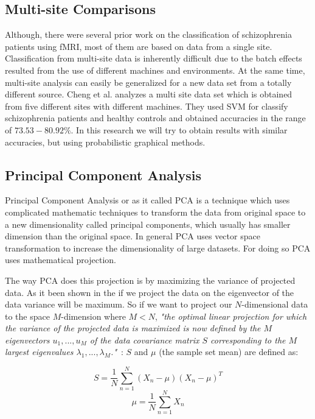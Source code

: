 \documentclass{article} %
\begin{document}
\subsection{Multi-site Comparisons}
Although, there were several prior work on the classification of schizophrenia 
patients using fMRI, most of them are based on data from a single site. 
Classification from multi-site data is inherently difficult due to the batch 
effects resulted from the use of different machines and environments. At the 
same time, multi-site analysis can easily be generalized for a new data set 
from a totally different source. Cheng et al. \cite{Cheng2015} analyzes a 
multi site data set which is obtained from five different sites with different 
machines. They used SVM for classify schizophrenia patients and healthy 
controls and obtained accuracies in the range of $73.53- 80.92\%$. In this 
research we will try to obtain results with similar accuracies, but using 
probabilistic graphical methods.


\subsection{Principal Component Analysis}
Principal Component Analysis or as it called PCA is a technique which uses 
complicated mathematic techniques to transform the data from original space 
to a new dimensionality called principal components, which usually has 
smaller dimension than the original space. In general PCA uses vector 
space transformation to increase the dimensionality of large datasets. For 
doing so PCA uses mathematical projection. \cite{richardson2009principal}

The way PCA does this projection is by maximizing the variance of projected 
data. As it been shown in the \cite{bishop2006pattern} if we project the 
data on the eigenvector of the data variance will be maximum. So if we want 
to project our $N$-dimensional data to the space $M$-dimension where $M<N$, 
\textit{"the optimal linear projection for which the variance of the 
projected data is maximized is now defined by the $M$ eigenvectors 
$u_{1}, ... , u_{M}$ of the data covariance matrix $S$ corresponding to the
$M$ largest eigenvalues $\lambda_{1}, ... ,\lambda_{M}$."}~\cite{bishop2006pattern}: 
$S$ and $\mu$ (the sample set mean) are defined as:

\begin{multicols}{2}
\begin{equation}
S = \frac{1}{N} \sum_{n=1}^{N}(X_{n}-\mu)(X_{n}-\mu)^T
\end{equation}\break
\begin{equation}
\mu = \frac{1}{N} \sum_{n=1}^{N}X_{n}
\end{equation}
\end{multicols}
\end{document}
